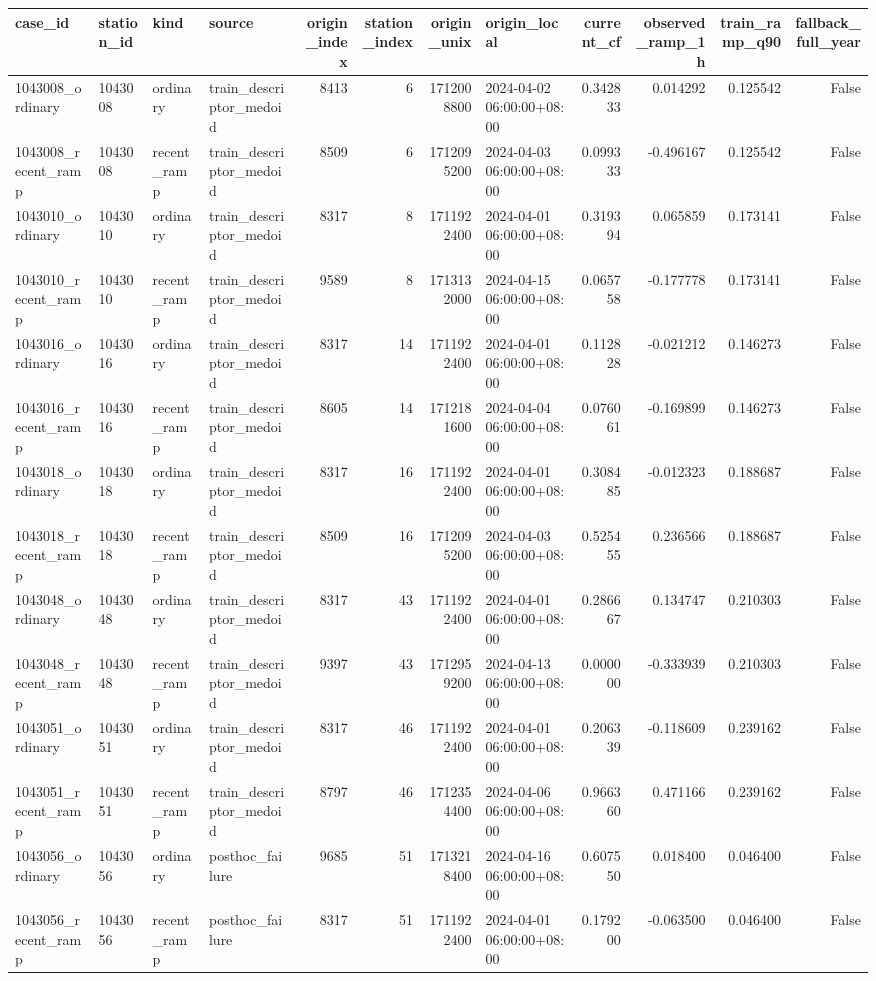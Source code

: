 \begin{tabular}{llllrrrlrrrr}
\toprule
case\_id & station\_id & kind & source & origin\_index & station\_index & origin\_unix & origin\_local & current\_cf & observed\_ramp\_1h & train\_ramp\_q90 & fallback\_full\_year \\
\midrule
1043008\_ordinary & 1043008 & ordinary & train\_descriptor\_medoid & 8413 & 6 & 1712008800 & 2024-04-02 06:00:00+08:00 & 0.342833 & 0.014292 & 0.125542 & False \\
1043008\_recent\_ramp & 1043008 & recent\_ramp & train\_descriptor\_medoid & 8509 & 6 & 1712095200 & 2024-04-03 06:00:00+08:00 & 0.099333 & -0.496167 & 0.125542 & False \\
1043010\_ordinary & 1043010 & ordinary & train\_descriptor\_medoid & 8317 & 8 & 1711922400 & 2024-04-01 06:00:00+08:00 & 0.319394 & 0.065859 & 0.173141 & False \\
1043010\_recent\_ramp & 1043010 & recent\_ramp & train\_descriptor\_medoid & 9589 & 8 & 1713132000 & 2024-04-15 06:00:00+08:00 & 0.065758 & -0.177778 & 0.173141 & False \\
1043016\_ordinary & 1043016 & ordinary & train\_descriptor\_medoid & 8317 & 14 & 1711922400 & 2024-04-01 06:00:00+08:00 & 0.112828 & -0.021212 & 0.146273 & False \\
1043016\_recent\_ramp & 1043016 & recent\_ramp & train\_descriptor\_medoid & 8605 & 14 & 1712181600 & 2024-04-04 06:00:00+08:00 & 0.076061 & -0.169899 & 0.146273 & False \\
1043018\_ordinary & 1043018 & ordinary & train\_descriptor\_medoid & 8317 & 16 & 1711922400 & 2024-04-01 06:00:00+08:00 & 0.308485 & -0.012323 & 0.188687 & False \\
1043018\_recent\_ramp & 1043018 & recent\_ramp & train\_descriptor\_medoid & 8509 & 16 & 1712095200 & 2024-04-03 06:00:00+08:00 & 0.525455 & 0.236566 & 0.188687 & False \\
1043048\_ordinary & 1043048 & ordinary & train\_descriptor\_medoid & 8317 & 43 & 1711922400 & 2024-04-01 06:00:00+08:00 & 0.286667 & 0.134747 & 0.210303 & False \\
1043048\_recent\_ramp & 1043048 & recent\_ramp & train\_descriptor\_medoid & 9397 & 43 & 1712959200 & 2024-04-13 06:00:00+08:00 & 0.000000 & -0.333939 & 0.210303 & False \\
1043051\_ordinary & 1043051 & ordinary & train\_descriptor\_medoid & 8317 & 46 & 1711922400 & 2024-04-01 06:00:00+08:00 & 0.206339 & -0.118609 & 0.239162 & False \\
1043051\_recent\_ramp & 1043051 & recent\_ramp & train\_descriptor\_medoid & 8797 & 46 & 1712354400 & 2024-04-06 06:00:00+08:00 & 0.966360 & 0.471166 & 0.239162 & False \\
1043056\_ordinary & 1043056 & ordinary & posthoc\_failure & 9685 & 51 & 1713218400 & 2024-04-16 06:00:00+08:00 & 0.607550 & 0.018400 & 0.046400 & False \\
1043056\_recent\_ramp & 1043056 & recent\_ramp & posthoc\_failure & 8317 & 51 & 1711922400 & 2024-04-01 06:00:00+08:00 & 0.179200 & -0.063500 & 0.046400 & False \\
\bottomrule
\end{tabular}
